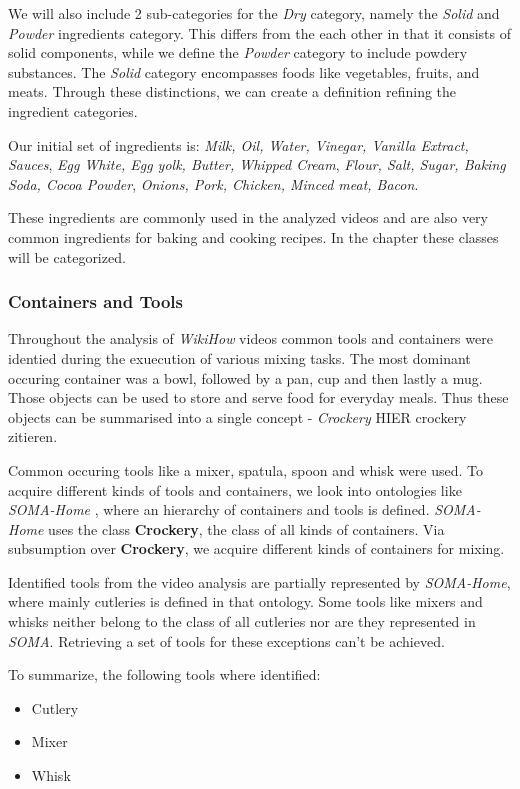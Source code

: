 We will also include 2 sub-categories for the \textit{Dry} category, namely the \textit{Solid} and \textit{Powder} ingredients category. 
This differs from the each other in that it consists of solid components, while we define the \textit{Powder} category to include powdery substances. The \textit{Solid} category encompasses foods like vegetables, fruits, and meats. 
Through these distinctions, we can create a definition refining the ingredient categories.

Our initial set of ingredients is: \textit{Milk, Oil, Water, Vinegar, Vanilla Extract, Sauces}, \textit{Egg White, Egg yolk, Butter, Whipped Cream}, \textit{Flour, Salt, Sugar, Baking Soda, Cocoa Powder},
\textit{Onions, Pork, Chicken, Minced meat, Bacon}.

These ingredients are commonly used in the analyzed videos and are also very common ingredients for baking and cooking recipes.
In the chapter  these classes will be categorized.

\subsubsection{Containers and Tools}
\label{sec:ContainersAndToolsAcquisition}
Throughout the analysis of \textit{WikiHow} videos common tools and containers were identied during the exuecution of various mixing tasks.
The most dominant occuring container was a bowl, followed by a pan, cup and then lastly a mug.
Those objects can be used to store and serve food for everyday meals. Thus these objects can be summarised 
into a single concept - \textit{Crockery} HIER crockery zitieren. 

Common occuring tools like a mixer, spatula, spoon and whisk were used. 
To acquire different kinds of tools and containers, we look into ontologies like \textit{SOMA-Home} \cite{soma},
where an hierarchy of containers and tools is defined. \textit{SOMA-Home} uses the class \textbf{Crockery}, the class of all kinds of containers.
Via subsumption over \textbf{Crockery}, we acquire different kinds of containers for mixing.

Identified tools from the video analysis are partially represented by \textit{SOMA-Home}, where mainly cutleries is defined in that ontology.
Some tools like mixers and whisks neither belong to the class of all cutleries nor are they represented in \textit{SOMA}. Retrieving a set of tools
for these exceptions can't be achieved.

To summarize, the following tools where identified: 
\begin{itemize}
  \item Cutlery
  \item Mixer
  \item Whisk
\end{itemize}

